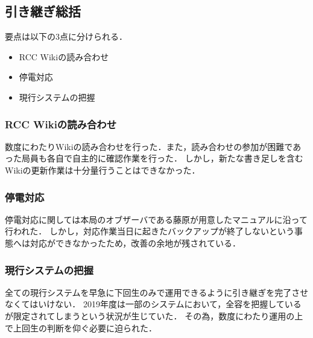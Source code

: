 \subsection*{引き継ぎ総括}


要点は以下の3点に分けられる．
 \begin{itemize}
\item RCC Wikiの読み合わせ
\item 停電対応
\item 現行システムの把握
 \end{itemize}
\subsubsection* {RCC Wikiの読み合わせ}
数度にわたりWikiの読み合わせを行った．また，読み合わせの参加が困難であった局員も各自で自主的に確認作業を行った．
しかし，新たな書き足しを含むWikiの更新作業は十分量行うことはできなかった．
\subsubsection* {停電対応}
停電対応に関しては本局のオブザーバである藤原が用意したマニュアルに沿って行われた．
しかし，対応作業当日に起きたバックアップが終了しないという事態へは対応ができなかったため，改善の余地が残されている．
\subsubsection* {現行システムの把握}
全ての現行システムを早急に下回生のみで運用できるように引き継ぎを完了させなくてはいけない．
2019年度は一部のシステムにおいて，全容を把握している\systemStaff{}が限定されてしまうという状況が生じていた．
その為，数度にわたり運用の上で上回生の判断を仰ぐ必要に迫られた．
